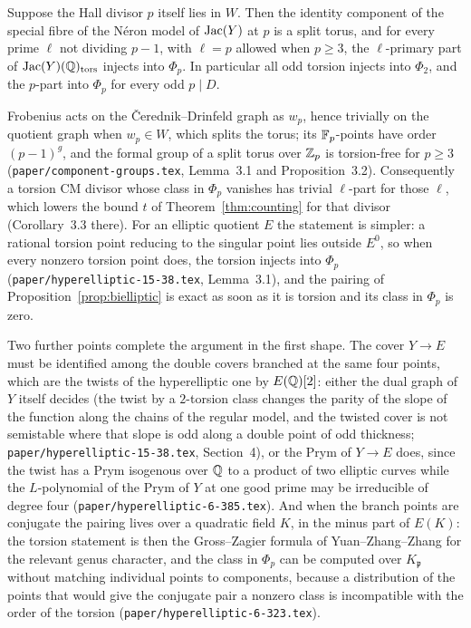 \begin{proposition}\label{prop:torsion-injects}
Suppose the Hall divisor $p$ itself lies in $W$. Then the identity component of the special fibre of the N\'eron
model of $\operatorname{Jac}(Y)$ at $p$ is a split torus, and for every prime $\ell$ not dividing $p-1$, with $\ell=p$
allowed when $p\ge3$, the $\ell$-primary part of $\operatorname{Jac}(Y)(\mathbb{Q})_{\mathrm{tors}}$ injects into $\Phi_p$. In
particular all odd torsion injects into $\Phi_2$, and the $p$-part into $\Phi_p$ for every odd $p\mid D$.
\end{proposition}

Frobenius acts on the \v{C}erednik--Drinfeld graph as $w_p$, hence trivially on the quotient graph when
$w_p\in W$, which splits the torus; its $\mathbb{F}_p$-points have order $(p-1)^g$, and the formal group of a split torus
over $\mathbb{Z}_p$ is torsion-free for $p\ge3$ (\texttt{paper/component-groups.tex}, Lemma~3.1 and Proposition~3.2).
Consequently a torsion CM divisor whose class in $\Phi_p$ vanishes has trivial $\ell$-part for those $\ell$,
which lowers the bound $t$ of Theorem~\ref{thm:counting} for that divisor (Corollary~3.3 there). For an
elliptic quotient $E$ the statement is simpler: a rational torsion point reducing to the singular point lies
outside $E^0$, so when every nonzero torsion point does, the torsion injects into $\Phi_p$
(\texttt{paper/hyperelliptic-15-38.tex}, Lemma~3.1), and the pairing of Proposition~\ref{prop:bielliptic} is
exact as soon as it is torsion and its class in $\Phi_p$ is zero.

Two further points complete the argument in the first shape. The cover $Y\to E$ must be identified among the
double covers branched at the same four points, which are the twists of the hyperelliptic one by $E(\mathbb{Q})[2]$:
either the dual graph of $Y$ itself decides (the twist by a $2$-torsion class changes the parity of the slope of
the function along the chains of the regular model, and the twisted cover is not semistable where that slope is
odd along a double point of odd thickness; \texttt{paper/hyperelliptic-15-38.tex}, Section~4), or the Prym of
$Y\to E$ does, since the twist has a Prym isogenous over $\mathbb{Q}$ to a product of two elliptic curves while the
$L$-polynomial of the Prym of $Y$ at one good prime may be irreducible of degree four
(\texttt{paper/hyperelliptic-6-385.tex}). And when the branch points are conjugate the pairing lives over a
quadratic field $K$, in the minus part of $E(K)$: the torsion statement is then the Gross--Zagier formula of
Yuan--Zhang--Zhang for the relevant genus character, and the class in $\Phi_p$ can be computed over
$K_{\mathfrak p}$ without matching individual points to components, because a distribution of the points that
would give the conjugate pair a nonzero class is incompatible with the order of the torsion
(\texttt{paper/hyperelliptic-6-323.tex}).

